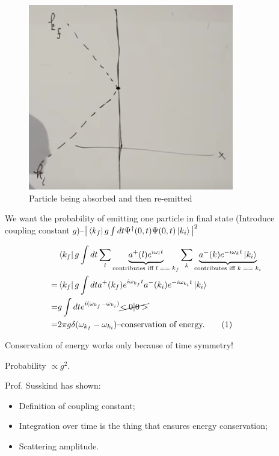 \documentclass[]{article}
\newcommand\numberthis{\addtocounter{equation}{1}\tag{\theequation}}
\begin{document}
\begin{figure}[H]
	\caption{Particle being absorbed and then re-emitted}\label{fig:particle:heavy:target}
	\includegraphics[width=0.8\textwidth]{particle-heavy-target}
\end{figure}

We want the probability of emitting one particle in final state (Introduce coupling constant $g$)--$\big| \bra{k_f} g \int dt \Psi^\dagger(0,t)\Psi(0,t)\ket{k_i} \big|^2$

\begin{align*}
	&\bra{k_f} g \int dt \sum_l \underbrace{a^+(l) e^{i \omega_l t}}_\text{contributes iff $l==k_f$} \sum_k \underbrace{a^-(k) e^{-i \omega_k t} \ket{k_i}}_\text{contributes iff $k==k_i$}\\
	=&\bra{k_f} g \int dt a^+(k_f) e^{i \omega_{k_f} t}  a^-(k_i) e^{-i \omega_{k_i} t} \ket{k_i}\\
	=& g \int dt e^{i(\omega_{k_f}-\omega_{k_i})}\cancel{<0|0>}\\
	=& 2 \pi g \delta(\omega_{k_f}-\omega_{k_i}) \text{--conservation of energy.} \numberthis \label{eq:conservation:energy}
\end{align*}

Conservation of energy works only because of time symmetry!

Probability $\propto g^2$.

Prof. Susskind has shown:
\begin{itemize}
	\item Definition of coupling constant;
	\item Integration over time is the thing that ensures energy conservation;
	\item Scattering amplitude.
\end{itemize}
\end{document}
